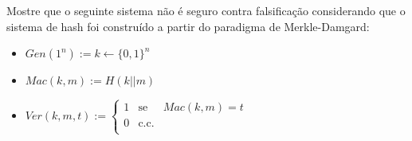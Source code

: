 \begin{exercicio}
  Mostre que o seguinte sistema não é seguro contra falsificação considerando que o sistema de hash foi construído a partir do paradigma de Merkle-Damgard:
\begin{itemize}
\item $Gen(1^n) := k \leftarrow \{0,1\}^n$
\item $Mac(k,m) := H(k||m)$
\item $Ver(k,m,t) := \left\{
    \begin{array}{lcl}
      1 & \textrm{se} & Mac(k,m) = t\\
      0 & \textrm{c.c.} &\\
    \end{array}
    \right.$ 
\end{itemize}
\end{exercicio}

\begin{exercicio}
\end{exercicio}

